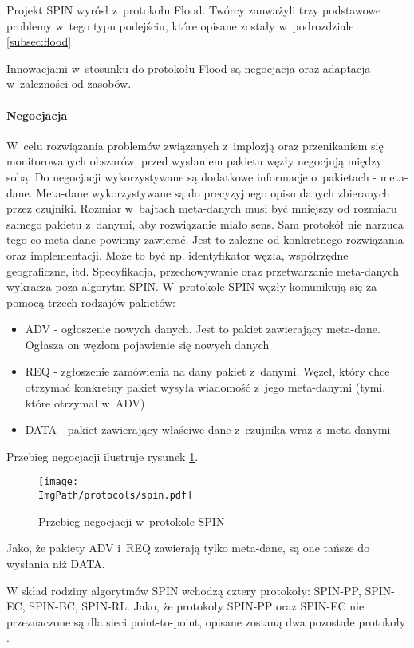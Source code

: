 Projekt SPIN wyrósł z~protokołu Flood. Twórcy zauważyli trzy podstawowe problemy w~tego typu podejściu, które opisane zostały w~podrozdziale \ref{subsec:flood}

Innowacjami w~stosunku do protokołu Flood są negocjacja oraz adaptacja w~zależności od zasobów.

\paragraph{Negocjacja} W~celu rozwiązania problemów związanych z~implozją oraz przenikaniem się monitorowanych obszarów, przed wysłaniem pakietu węzły negocjują między sobą. Do negocjacji wykorzystywane są dodatkowe informacje o~pakietach - meta-dane. 
Meta-dane wykorzystywane są do precyzyjnego opisu danych zbieranych przez czujniki. Rozmiar w~bajtach meta-danych musi być mniejszy od rozmiaru samego pakietu z~danymi, aby rozwiązanie miało sens.
Sam protokół nie narzuca tego co meta-dane powinny zawierać. Jest to zależne od konkretnego rozwiązania oraz implementacji. Może to być np. identyfikator węzła, współrzędne geograficzne, itd. Specyfikacja, przechowywanie oraz przetwarzanie meta-danych wykracza poza algorytm SPIN.
W~protokole SPIN węzły komunikują się za pomocą trzech rodzajów pakietów:
\begin{itemize}
	\item ADV - ogłoszenie nowych danych. Jest to pakiet zawierający meta-dane. Ogłasza on węzłom pojawienie się nowych danych
	\item REQ - zgłoszenie zamówienia na dany pakiet z~danymi. Węzeł, który chce otrzymać konkretny pakiet wysyła wiadomość z~jego meta-danymi (tymi, które otrzymał w~ADV)
	\item DATA - pakiet zawierający właściwe dane z~czujnika wraz z~meta-danymi
\end{itemize}
Przebieg negocjacji ilustruje rysunek \ref{fig:spin}.
\begin{figure}[H]
	\label{fig:spin}
	\begin{center}
		\texttt{[image: \\ImgPath/protocols/spin.pdf]}
	\end{center}
	\caption{Przebieg negocjacji w~protokole SPIN}
\end{figure}

Jako, że pakiety ADV i~REQ zawierają tylko meta-dane, są one tańsze do wysłania niż DATA.

W skład rodziny algorytmów SPIN wchodzą cztery protokoły: SPIN-PP, SPIN-EC, SPIN-BC, SPIN-RL. Jako, że protokoły SPIN-PP oraz SPIN-EC nie przeznaczone są dla sieci point-to-point, opisane zostaną dwa pozostałe protokoły \cite{Dargie2010, Kulik2002}.

